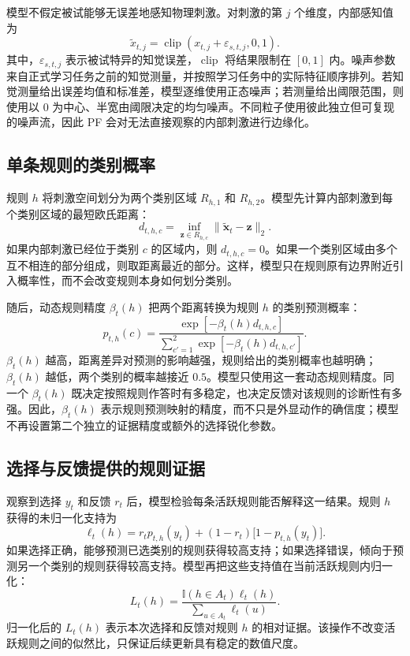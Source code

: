 \documentclass[12pt]{article}
\newcommand{\ind}{\mathbb I}
\begin{document}
模型不假定被试能够无误差地感知物理刺激。对刺激的第 $j$ 个维度，内部感知值为
\begin{equation}
\widetilde x_{t,j}
=\operatorname{clip}(x_{t,j}+\varepsilon_{s,t,j},0,1).
\label{eq:perception}
\end{equation}
其中，$\varepsilon_{s,t,j}$ 表示被试特异的知觉误差，$\operatorname{clip}$ 将结果限制在 $[0,1]$ 内。噪声参数来自正式学习任务之前的知觉测量，并按照学习任务中的实际特征顺序排列。若知觉测量给出误差均值和标准差，模型逐维使用正态噪声；若测量给出阈限范围，则使用以 0 为中心、半宽由阈限决定的均匀噪声。不同粒子使用彼此独立但可复现的噪声流，因此 PF 会对无法直接观察的内部刺激进行边缘化。

\subsection{单条规则的类别概率}

规则 $h$ 将刺激空间划分为两个类别区域 $R_{h,1}$ 和 $R_{h,2}$。模型先计算内部刺激到每个类别区域的最短欧氏距离：
\begin{equation}
d_{t,h,c}
=\inf_{\bm z\in R_{h,c}}
\lVert\widetilde{\bm x}_t-\bm z\rVert_2.
\label{eq:boundary-distance}
\end{equation}
如果内部刺激已经位于类别 $c$ 的区域内，则 $d_{t,h,c}=0$。如果一个类别区域由多个互不相连的部分组成，则取距离最近的部分。这样，模型只在规则原有边界附近引入概率性，而不会改变规则本身如何划分类别。

随后，动态规则精度 $\beta_t(h)$ 把两个距离转换为规则 $h$ 的类别预测概率：
\begin{equation}
p_{t,h}(c)
=
\frac{\exp[-\beta_t(h)d_{t,h,c}]}
{\sum_{c'=1}^{2}\exp[-\beta_t(h)d_{t,h,c'}]}.
\label{eq:rule-emission}
\end{equation}
$\beta_t(h)$ 越高，距离差异对预测的影响越强，规则给出的类别概率也越明确；$\beta_t(h)$ 越低，两个类别的概率越接近 $0.5$。模型只使用这一套动态规则精度。同一个 $\beta_t(h)$ 既决定按照规则作答时有多稳定，也决定反馈对该规则的诊断性有多强。因此，$\beta_t(h)$ 表示规则预测映射的精度，而不只是外显动作的确信度；模型不再设置第二个独立的证据精度或额外的选择锐化参数。

\subsection{选择与反馈提供的规则证据}

观察到选择 $y_t$ 和反馈 $r_t$ 后，模型检验每条活跃规则能否解释这一结果。规则 $h$ 获得的未归一化支持为
\begin{equation}
\ell_t(h)
=r_t p_{t,h}(y_t)
+(1-r_t)\bigl[1-p_{t,h}(y_t)\bigr].
\label{eq:feedback-support}
\end{equation}
如果选择正确，能够预测已选类别的规则获得较高支持；如果选择错误，倾向于预测另一个类别的规则获得较高支持。模型再把这些支持值在当前活跃规则内归一化：
\begin{equation}
L_t(h)
=
\frac{\ind(h\in A_t)\ell_t(h)}
{\sum_{u\in A_t}\ell_t(u)}.
\label{eq:normalized-likelihood}
\end{equation}
归一化后的 $L_t(h)$ 表示本次选择和反馈对规则 $h$ 的相对证据。该操作不改变活跃规则之间的似然比，只保证后续更新具有稳定的数值尺度。
\end{document}
